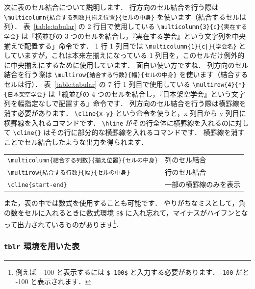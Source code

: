 \documentclass[
    paper=a4paper,      %
    article,            %
    fontsize=11pt,      %
    jafontsize=11pt,    %
    head_space=25mm,    %
    foot_space=25mm,    %
    gutter=20mm,        %
    fore-edge=20mm      %
    ]{jlreq}            %
\begin{document}
次に表のセル結合について説明します．
行方向のセル結合を行う際は \verb|\multicolumn{結合する列数}{揃え位置}{セルの中身}| を使います（結合するセルは列）．
表~\ref{table:tabular} の 2 行目で使用している \verb|\multicolumn{3}{c}{実在する学会}| は「横並びの 3 つのセルを結合し，『実在する学会』という文字列を中央揃えで配置する」命令です．
1 行 1 列目では \texttt{\textbackslash multicolumn\{1\}\{c|\}\{学会名\}} としていますが，これは本来左揃えになっている 1 列目を，このセルだけ例外的に中央揃えにするために使用しています．
面白い使い方ですね．
列方向のセル結合を行う際は \verb|\multirow{結合する行数}{幅}{セルの中身}| を使います（結合するセルは行）．
表~\ref{table:tabular} の 7 行 1 列目で使用している \verb|\multirow{4}{*}{日本架空学会}| は「縦並びの 4 つのセルを結合し，『日本架空学会』という文字列を幅指定なしで配置する」命令です．
列方向のセル結合を行う際は横罫線を消す必要があります．
\verb|\cline{x-y}| という命令を使うと，x 列目から y 列目に横罫線を入れるコマンドです．
\verb|\hline| がその行全体に横罫線を入れるのに対して \verb|\cline{}| はその行に部分的な横罫線を入れるコマンドです．
横罫線を消すことでセル結合したような出力を得られます．

\begin{tcolorbox}[title={\texttt{tabular} 環境でセル結合する際に使用するコマンド}]
    \begin{tabular}{ll}
        \verb|\multicolumn{結合する列数}{揃え位置}{セルの中身}| & 列のセル結合  \\
        \verb|\multirow{結合する行数}{幅}{セルの中身}|  & 行のセル結合  \\
        \verb|\cline{start-end}|    & 一部の横罫線のみを表示
    \end{tabular}
\end{tcolorbox}

また，表の中では数式を使用することも可能です．
やりがちなミスとして，負の数をセルに入れるときに数式環境 \verb|$$| に入れ忘れて，マイナスがハイフンとなって出力されているものがあります\footnote{例えば $-100$ と表示するには \texttt{\$-100\$} と入力する必要があります．\texttt{-100} だと -100 と表示されます．}．

\subsubsection{\texttt{tblr} 環境を用いた表}
\label{sssec:tblr}
\end{document}

